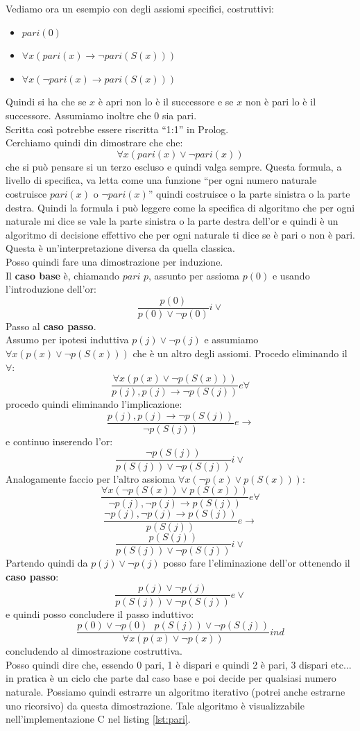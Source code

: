 \documentclass[a4paper,12pt, oneside]{book}
\begin{document}
\begin{esempio}
  Vediamo ora un esempio con degli assiomi specifici, costruttivi:
  \begin{itemize}
    \item $pari(0)$
    \item $\forall x(pari(x)\to \neg pari(S(x)))$
    \item $\forall x(\neg pari(x)\to pari(S(x)))$
  \end{itemize}
  Quindi si ha che se $x$ è apri non lo è il successore e se $x$ non è pari lo è
  il successore. Assumiamo inoltre che 0 sia pari.\\
  \textup{Scritta così potrebbe essere riscritta ``1:1'' in Prolog.}\\
  Cerchiamo quindi din dimostrare che che:
  \[\forall x(pari(x)\lor \neg pari(x))\]
  che si può pensare si un terzo escluso e quindi valga sempre. Questa formula,
  a 
  livello di specifica, va letta come una funzione ``per ogni numero naturale
  costruisce $pari(x)$ o $\neg pari(x)$'' quindi costruisce o la parte sinistra
  o 
  la parte destra. Quindi la formula i può leggere come la specifica di
  algoritmo 
  che per ogni naturale mi dice se vale la parte sinistra o la parte destra
  dell'or e quindi è un algoritmo di decisione effettivo che per ogni naturale
  ti 
  dice se è pari o non è pari. Questa è un'interpretazione diversa da quella
  classica. \\
  Posso quindi fare una dimostrazione per induzione.\\
  Il \textbf{caso base} è, chiamando $pari$ $p$, assunto per assioma $p(0)$ e
  usando l'introduzione dell'or:
  \[\frac{p(0)}{p(0)\lor \neg p(0)}i\lor\]
  Passo al \textbf{caso passo}.\\
  Assumo per ipotesi induttiva $p(j)\lor \neg p(j)$ e assumiamo $\forall
  x(p(x)\lor \neg p(S(x)))$ che è un altro degli assiomi. Procedo eliminando il
  $\forall$:
  \[\frac{\forall x(p(x)\lor \neg p(S(x)))}{p(j),p(j)\to\neg
      p(S(j))}e\forall\]
  procedo quindi eliminando l'implicazione:
  \[\frac{p(j),p(j)\to\neg
      p(S(j))}{\neg p(S(j))}e\to\]
  e continuo inserendo l'or:
  \[\frac{\neg p(S(j))}{p(S(j))\lor\neg p(S(j))}i\lor\]
  Analogamente faccio per l'altro assioma $\forall x(\neg p(x)\lor p(S(x)))$:
  \[\frac{\forall x(\neg p(S(x) )\lor  p(S(x)))}{\neg p(j),\neg p(j)\to
      p(S(j))}e\forall\]
  \[\frac{\neg p(j),\neg p(j)\to
      p(S(j))}{p(S(j))}e\to\]
  \[\frac{p(S(j))}{p(S(j))\lor\neg p(S(j))}i\lor\]
  Partendo quindi da $p(j)\lor \neg p(j)$ posso fare l'eliminazione dell'or
  ottenendo il \textbf{caso passo}:
  \[\frac{p(j)\lor\neg p(j)}{p(S(j))\lor\neg p(S(j))}e\lor\]
  e quindi posso concludere il passo induttivo:
  \[\frac{p(0)\lor \neg p(0)\,\,\,\,p(S(j))\lor\neg p(S(j))}{\forall
      x(p(x)\lor \neg p(x))}ind\]
  concludendo al dimostrazione costruttiva.\\
  Posso quindi dire che, essendo 0 pari, 1 è dispari e quindi 2 è pari, 3
  dispari etc$\ldots$ in pratica è un ciclo che parte dal caso base e poi decide
  per qualsiasi numero naturale. Possiamo quindi estrarre un algoritmo iterativo
  (potrei anche estrarne uno ricorsivo) da questa dimostrazione. Tale algoritmo
  è visualizzabile nell'implementazione C nel listing \ref{lst:pari}.
\end{esempio}
\end{document}
